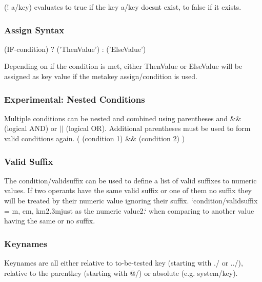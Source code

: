 {\ttfamily (! a/key)} evaluates to true if the key {\ttfamily a/key} doesn\textquotesingle{}t exist, to false if it exists.

\subsubsection*{Assign Syntax}

\begin{DoxyVerb}(IF-condition) ? ('ThenValue') : ('ElseValue')
\end{DoxyVerb}


Depending on if the condition is met, either \textquotesingle{}Then\+Value\textquotesingle{} or \textquotesingle{}Else\+Value\textquotesingle{} will be assigned as key value if the metakey {\ttfamily assign/condition} is used.

\subsubsection*{Experimental\+: Nested Conditions}

Multiple conditions can be nested and combined using parentheses and {\ttfamily \&\&} (logical A\+ND) or {\ttfamily $\vert$$\vert$} (logical OR). Additional parentheses must be used to form valid conditions again. {\ttfamily (} {\ttfamily (condition 1) \&\& (condition 2)} {\ttfamily )}

\subsubsection*{Valid Suffix}

The {\ttfamily condition/validsuffix} can be used to define a list of valid suffixes to numeric values. If two operants have the same valid suffix or one of them no suffix they will be treated by their numeric value ignoring their suffix. `condition/validsuffix = \textquotesingle{}m\textquotesingle{}, \textquotesingle{}cm\textquotesingle{}, \textquotesingle{}km2.\+3m{\ttfamily just as the numeric value}2.` when comparing to another value having the same or no suffix.

\subsubsection*{Keynames}

Keynames are all either relative to to-\/be-\/tested key (starting with {\ttfamily ./} or {\ttfamily ../}), relative to the parentkey (starting with {\ttfamily @/}) or absolute (e.\+g. {\ttfamily system/key}).

